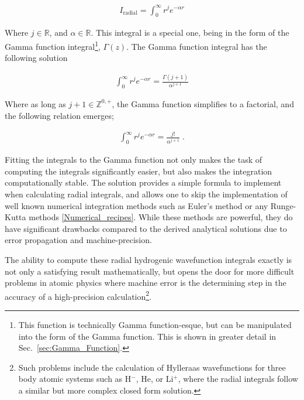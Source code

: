             \begin{align}
                I_{\text{radial}} = \int_0^\infty r^j e^{-\alpha r}
            \end{align}

            \noindent Where $j \in \mathbb{R}$, and $\alpha \in \mathbb{R}$. This integral is a special one, being in the form of the Gamma function integral\footnote{This function is technically Gamma function-esque, but can be manipulated into the form of the Gamma function. This is shown in greater detail in Sec.~\ref{sec:Gamma_Function}.}, $\Gamma(z)$. The Gamma function integral has the following solution 

            \begin{align}
                \int_0^\infty r^j e^{-\alpha r} = \frac{\Gamma(j + 1)}{\alpha^{j + 1}}
            \end{align}

            Where as long as $j + 1 \in \mathbb{Z}^{0,+}$, the Gamma function simplifies to a factorial, and the following relation emerges;

            \begin{align}
                \int_0^\infty r^j e^{-\alpha r} = \frac{j!}{\alpha^{j + 1}}\;.
            \end{align}

            \noindent Fitting the integrals to the Gamma function not only makes the task of computing the integrals significantly easier, but also makes the integration computationally stable. The solution provides a simple formula to implement when calculating radial integrals, and allows one to skip the implementation of well known numerical integration methods such as Euler's method or any Runge-Kutta methods \ref{Numerical_recipes}. While these methods are powerful, they do have significant drawbacks compared to the derived analytical solutions due to error propagation and machine-precision.
            
            The ability to compute these radial hydrogenic wavefunction integrals exactly is not only a satisfying result mathematically, but opens the door for more difficult problems in atomic physics where machine error is the determining step in the accuracy of a high-precision calculation\footnote{Such problems include the calculation of Hylleraas wavefunctions for three body atomic systems such as H$^-$, He, or Li$^+$, where the radial integrals follow a similar but more complex closed form solution.}.
            
